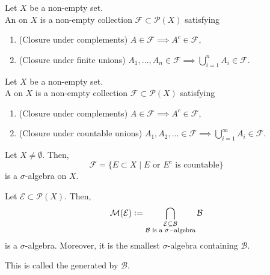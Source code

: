\documentclass[12pt]{article}	%
\begin{document}
\begin{defn}[Algebra]
	Let $X$ be a non-empty set.\\
	An  on $X$ is a non-empty collection $\mathcal{F} \subset \mathcal{P}(X)$ satisfying
	\begin{enumerate}
		\item (Closure under complements) $A \in \mathcal{F} \implies A^c \in \mathcal{F},$
		\item (Closure under finite unions) $A_1, \ldots, A_n \in \mathcal{F} \implies \bigcup_{i = 1}^n A_i \in \mathcal{F}.$
	\end{enumerate}
\end{defn}

\begin{defn}
	Let $X$ be a non-empty set.\\
	A  on $X$ is a non-empty collection $\mathcal{F} \subset \mathcal{P}(X)$ satisfying
	\begin{enumerate}
		\item (Closure under complements) $A \in \mathcal{F} \implies A^c \in \mathcal{F},$
		\item (Closure under countable unions) $A_1, A_2, \ldots \in \mathcal{F} \implies \bigcup_{i = 1}^\infty A_i \in \mathcal{F}.$
	\end{enumerate}
\end{defn}

\begin{ex}
	Let $X \neq \emptyset.$ Then,
	\begin{equation*} 
		\mathcal{F} = \{E \subset X \mid E \text{ or } E^c \text{ is countable}\}
	\end{equation*}
	is a $\sigma$-algebra on $X.$
\end{ex}

\begin{defn}
	Let $\mathcal{E} \subset \mathcal{P}(X).$ Then,
	\begin{equation*} 
		\mathcal{M}(\mathcal{E}) \vcentcolon= \bigcap_{\substack{\mathcal{E} \subset \mathcal{B}\\
		\mathcal{B} \text{ is a }\sigma-\text{algebra}}} \mathcal{B}
	\end{equation*}
	is a $\sigma$-algebra. Moreover, it is the smallest $\sigma$-algebra containing $\mathcal{B}.$

	This is called the  generated by $\mathcal{B}.$
\end{defn}
\end{document}
